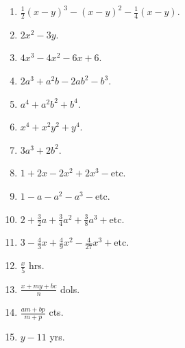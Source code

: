 \documentclass{book}
\begin{document}
\begin{enumerate}
\item $\frac{1}{2}\left(x - y\right)^3 - \left(x - y\right)^2
- \frac{1}{4}(x - y)$.

\item $2x^2 - 3y$.

\item $4x^3 - 4x^2 - 6x + 6$.

\item $2a^3 + a^2b - 2ab^2 - b^3$.

\item $a^4 + a^2b^2 + b^4$.

\item $x^4 + x^2y^2 + y^4$.

\item $3a^3 + 2b^2$.

\item $1 + 2x - 2x^2 + 2x^3 - \text{etc}$.

\item $1 - a - a^2 - a^3 - \text{etc}$.

\item $2 + \frac{3}{2} a + \frac{3}{4} a^2 + \frac{3}{8} a^3 +
\text{etc}$.

\item $3 - \frac{4}{3} x + \frac{4}{9} x^2 - \frac{4}{27} x^3
+ \text{etc}$.

\item $\displaystyle \frac{x}{5}$ hrs.

\item $\displaystyle \frac{x + my + bc}{n}$ dols.

\item $\displaystyle \frac{am + bp}{m + p}$ cts.

\item $y - 11$ yrs.
\end{enumerate}
\end{document}
